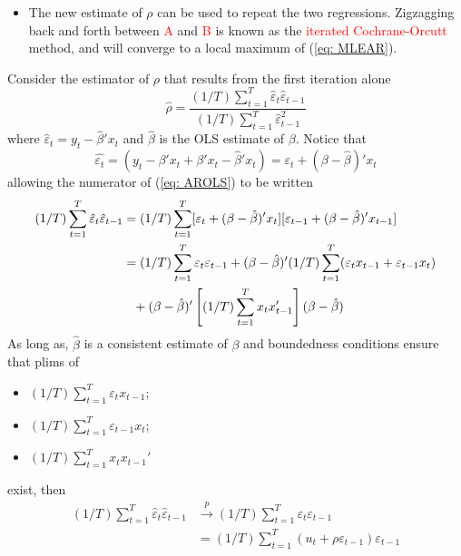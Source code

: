 \documentclass[10pt,handout,english]{beamer}
\begin{document}
\begin{frame}[allowframebreaks]
\begin{itemize}
\item The new estimate of $\rho$ can be used to repeat the two regressions. Zigzagging back and forth between \textcolor{red}{A} and \textcolor{red}{B} is known as the \textcolor{red}{iterated Cochrane-Orcutt} method, and will converge to a local maximum of (\ref{eq: MLEAR}).
\end{itemize}
Consider the estimator of $\rho$ that results from the first iteration alone
\begin{equation}\label{eq: AROLS}
\hat{\rho}=\frac{(1/T)\sum\limits_{t=1}^{T}\hat{\varepsilon}_t\hat{\varepsilon}_{t-1}}{(1/T)\sum\limits_{t=1}^{T}\hat{\varepsilon}_{t-1}^2}
\end{equation}
where $\hat{\varepsilon}_t=y_t-\hat{\beta}'x_t$ and $\hat{\beta}$ is the OLS estimate of $\beta$. Notice that
\[
\hat{\varepsilon_t}=(y_t-\beta'x_t+\beta'x_t-\hat{\beta}'x_t)=\varepsilon_t+(\beta-\hat{\beta})'x_t
\] 
allowing the numerator of (\ref{eq: AROLS}) to be written
\begingroup
\allowdisplaybreaks
\begin{align}\label{eq: proof1}
\begin{split}
(1/T)\sum\limits_{t=1}^{T}\hat{\varepsilon}_t\hat{\varepsilon}_{t-1}&=(1/T)\sum\limits_{t=1}^{T}[\varepsilon_t+(\beta-\hat{\beta})'x_t][\varepsilon_{t-1}+(\beta-\hat{\beta})'x_{t-1}]\\
&=(1/T)\sum\limits_{t=1}^{T}\varepsilon_t\varepsilon_{t-1}+(\beta-\hat{\beta})'(1/T)\sum\limits_{t=1}^{T}(\varepsilon_tx_{t-1}+\varepsilon_{t-1}x_{t})\\
&\textcolor{white}{=}+(\beta-\hat{\beta})'\left[(1/T)\sum\limits_{t=1}^{T}x_tx_{t-1}'\right](\beta-\hat{\beta})
\end{split}
\end{align}
\endgroup
As long as, $\hat{\beta}$ is a consistent estimate of $\beta$ and boundedness conditions ensure that plims of
\begin{itemize}
\item $(1/T)\sum\limits_{t=1}^{T}\varepsilon_tx_{t-1}$;
\item $(1/T)\sum\limits_{t=1}^{T}\varepsilon_{t-1}x_{t}$;
\item $(1/T)\sum\limits_{t=1}^{T}x_tx_{t-1}'$
\end{itemize}
exist, then
\begin{align*}
(1/T)\sum\limits_{t=1}^T\hat{\varepsilon}_t\hat{\varepsilon}_{t-1} &\overset{p}{\to}(1/T)\sum\limits_{t=1}^T\varepsilon_t\varepsilon_{t-1}\\
 &=(1/T)\sum\limits_{t=1}^T(u_t+\rho\varepsilon_{t-1})\varepsilon_{t-1}\\

\end{align*}
\end{frame}
\end{document}
